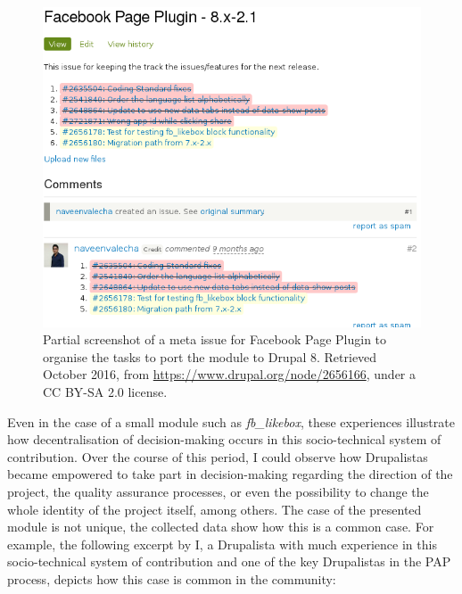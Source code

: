 \begin{figure}[H]
   \centering
   \includegraphics[scale=0.55]{img/online/fb_likebox_8_meta.png}
    \caption[Meta issue in Facebook Page Plugin]%
   {Partial screenshot of a meta issue for Facebook Page Plugin to organise the tasks to port the module to Drupal 8. Retrieved  October 2016, from \url{https://www.drupal.org/node/2656166}, under a CC BY-SA 2.0 license.}
\label{fb_likebox_meta}
\end{figure}

Even in the case of a small module such as \textit{fb\_likebox}, these experiences illustrate how decentralisation of decision-making occurs in this socio-technical system of contribution. Over the course of this period, I could observe how Drupalistas became empowered to take part in decision-making regarding the direction of the project, the quality assurance processes, or even the possibility to change the whole identity of the project itself, among others. The case of the presented module is not unique, the collected data show how this is a common case. For example, the following excerpt by I, a Drupalista with much experience in this socio-technical system of contribution and one of the key Drupalistas in the PAP process, depicts how this case is common in the community:

